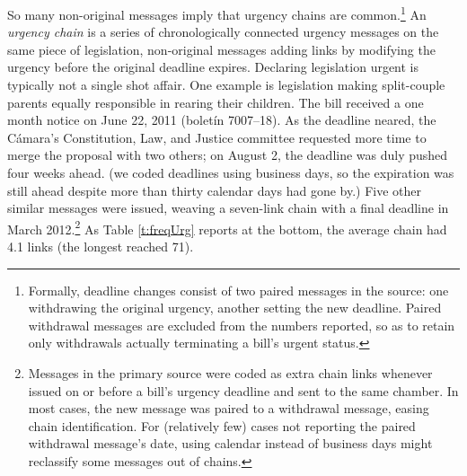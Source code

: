 \documentclass[letter,12pt]{article}
\begin{document}
So many non-original messages imply that urgency chains are common.\footnote{Formally, deadline changes consist of two paired messages in the source: one withdrawing the original urgency, another setting the new deadline. Paired withdrawal messages are excluded from the numbers reported, so as to retain only withdrawals actually terminating a bill's urgent status.} An \emph{urgency chain} is a series of chronologically connected urgency messages on the same piece of legislation, non-original messages adding links by modifying the urgency before the original deadline expires. Declaring legislation urgent is typically not a single shot affair. One example is legislation making split-couple parents equally responsible in rearing their children. The bill received a one month notice on June 22, 2011 (bolet\'in 7007--18). As the deadline neared, the C\'amara's Constitution, Law, and Justice committee requested more time to merge the proposal with two others; on August 2, the deadline was duly pushed four weeks ahead. (we coded deadlines using business days, so the expiration was still ahead despite more than thirty calendar days had gone by.) Five other similar messages were issued, weaving a seven-link chain with a final deadline in March 2012.\footnote{Messages in the primary source were coded as extra chain links whenever issued on or before a bill's urgency deadline and sent to the same chamber. In most cases, the new message was paired to a withdrawal message, easing chain identification. For (relatively few) cases not reporting the paired withdrawal message's date, using calendar instead of business days might reclassify some messages out of chains.} As Table \ref{t:freqUrg} reports at the bottom, the average chain had 4.1 links (the longest reached 71). 
\end{document}

